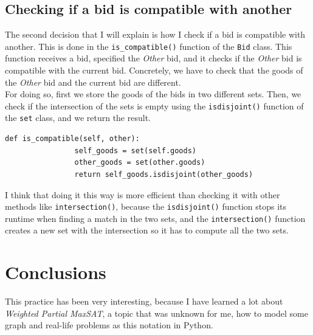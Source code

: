 \documentclass[11pt]{article}
\begin{document}
    \subsection{Checking if a bid is compatible with another}
    \label{subsec:compatiblebids}
        The second decision that I will explain is how I check if a bid is compatible with another.
        This is done in the \verb|is_compatible()| function of the \verb|Bid| class.
        This function receives a bid, specified the \textit{Other} bid, and it checks if the \textit{Other} bid is compatible with the current bid.
        Concretely, we have to check that the goods of the \textit{Other} bid and the current bid are different.\\
        For doing so, first we store the goods of the bids in two different sets.
        Then, we check if the intersection of the sets is empty using the \verb|isdisjoint()| function of the \verb|set| class, and we return the result.\\
        \begin{lstlisting}[label={lst:lstlisting11}]
            def is_compatible(self, other):
                self_goods = set(self.goods)
                other_goods = set(other.goods)
                return self_goods.isdisjoint(other_goods)
        \end{lstlisting}
        I think that doing it this way is more efficient than checking it with other methods like \verb|intersection()|, because the \verb|isdisjoint()| function stops its runtime when finding a match in the two sets, and the \verb|intersection()| function creates a new set with the intersection so it has to compute all the two sets.\\

    \section{Conclusions}
    \label{sec:conclusions}
        This practice has been very interesting, because I have learned a lot about \textit{Weighted Partial MaxSAT}, a topic that was unknown for me, how to model some graph and real-life problems as this notation in Python.\\
\end{document}
